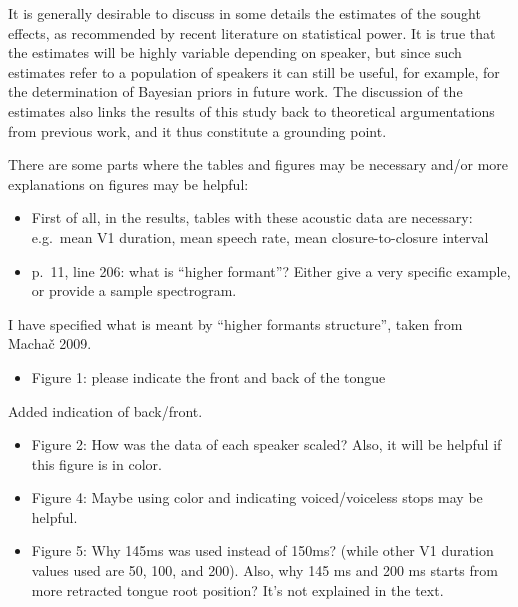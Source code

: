 \documentclass[]{article}
\providecommand{\tightlist}{%
  \setlength{\itemsep}{0pt}\setlength{\parskip}{0pt}}
\begin{document}
\color{plum}

It is generally desirable to discuss in some details the estimates of
the sought effects, as recommended by recent literature on statistical
power. It is true that the estimates will be highly variable depending
on speaker, but since such estimates refer to a population of speakers
it can still be useful, for example, for the determination of Bayesian
priors in future work. The discussion of the estimates also links the
results of this study back to theoretical argumentations from previous
work, and it thus constitute a grounding point. \color{black}

There are some parts where the tables and figures may be necessary
and/or more explanations on figures may be helpful:

\begin{itemize}
\item
  First of all, in the results, tables with these acoustic data are
  necessary: e.g.~mean V1 duration, mean speech rate, mean
  closure-to-closure interval
\item
  p.~11, line 206: what is ``higher formant''? Either give a very
  specific example, or provide a sample spectrogram.
\end{itemize}

\color{plum}

I have specified what is meant by ``higher formants structure'', taken
from Machač 2009. \color{black}

\begin{itemize}
\tightlist
\item
  Figure 1: please indicate the front and back of the tongue
\end{itemize}

\color{plum}

Added indication of back/front. \color{black}

\begin{itemize}
\item
  Figure 2: How was the data of each speaker scaled? Also, it will be
  helpful if this figure is in color.
\item
  Figure 4: Maybe using color and indicating voiced/voiceless stops may
  be helpful.
\item
  Figure 5: Why 145ms was used instead of 150ms? (while other V1
  duration values used are 50, 100, and 200). Also, why 145 ms and 200
  ms starts from more retracted tongue root position? It's not explained
  in the text.
\end{itemize}
\end{document}
